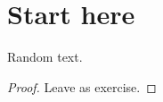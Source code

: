 

\section{Start here}
\begin{theorem}
Random text.
\end{theorem}

\begin{proof}
    Leave as exercise.
\end{proof}
